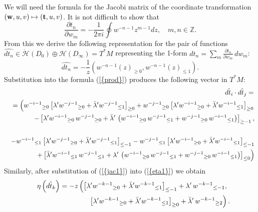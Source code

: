 \documentclass[numbook, envcountsame, envcountreset]{svjour3}
\begin{document}
We will need the formula for the Jacobi matrix of the coordinate transformation $({\bf w}, u, v) \mapsto ({\bf t}, u, v)$. It is not difficult to show that
\begin{equation}\label{jac}
\frac{{\partial} t_n}{{\partial} w_m} =-\frac1{2\pi i}\oint w^{-n-1} z^{m-1} dz, \quad m, n\in \mathbb Z.
\end{equation}
From this we derive the following representation for the pair of functions $\hat{dt_n}\in \dot {\mathcal H}(D_0)\oplus {\mathcal H} (D_\infty) =T^*M$
representing the 1-form $dt_n =\sum_m \frac{{\partial} t_n}{{\partial} w_m}\, dw_m$:
\begin{equation}\label{jac1}
\hat{dt_n} = -\frac1{z} \left( w^{-n-1}(z)_{\geq 0}, w^{-n-1}(z)_{\leq 1}\right).
\end{equation}
Substitution into the formula {(\ref{{prod}})} produces the following vector in $T^*M$:
\begin{eqnarray}
&&
\hat{dt_i}\cdot \hat {dt_j} =
{\nonumber}\\
&&
=\left({w^{-i-1}}_{\geq 0} \left[ \lambda' {w^{-j-1}}_{\geq 0} +\bar\lambda' {w^{-j-1}}_{\leq 1}\right]_{\geq 0}
+ {w^{-j-1}}_{\geq 0} \left[ \lambda' {w^{-i-1}}_{\geq 0} +\bar\lambda' {w^{-i-1}}_{\leq 1}\right]_{\geq 0}
\right.
{\nonumber}\\
&&
-\left[ \lambda' {w^{-i-1}}_{\geq 0}\,{w^{-j-1}}_{\geq 0} +\bar\lambda'\,\left( {w^{-i-1}}_{\geq 0}\, {w^{-j-1}}_{\leq 1} +{w^{-j-1}}_{\geq 0}\, {w^{-i-1}}_{\leq 1}\right)\right]_{\geq -1},
{\nonumber}\\
&&
{\nonumber}\\
&&
-{w^{-i-1}}_{\leq 1} \left[ \lambda' {w^{-j-1}}_{\geq 0} +\bar\lambda' {w^{-j-1}}_{\leq 1}\right]_{\leq -1}
- {w^{-j-1}}_{\leq 1} \left[ \lambda' {w^{-i-1}}_{\geq 0} +\bar\lambda' {w^{-i-1}}_{\leq 1}\right]_{\leq -1}
{\nonumber}\\
&&\left.
+\left[ \bar\lambda' {w^{-i-1}}_{\leq 1}\,{w^{-j-1}}_{\leq 1} +\lambda'\,\left( {w^{-i-1}}_{\geq 0}\, {w^{-j-1}}_{\leq 1} +{w^{-j-1}}_{\geq 0}\, {w^{-i-1}}_{\leq 1}\right)\right]_{\leq 0}
\right)
{\nonumber}
\end{eqnarray}
Similarly, after substitution of {(\ref{{jac1}})} into {(\ref{{eta1}})} we obtain
\begin{eqnarray}
&&
\eta\left( \hat{dt_k}\right)=
-z\left( \left[\lambda' {w^{-k-1}}_{\geq 0} +\bar \lambda' {w^{-k-1}}_{\leq 1} \right]_{\leq -1} +\lambda' \,  {w^{-k-1}}_{\leq -1},
\right.
{\nonumber}\\
&&
\left.
\qquad\qquad\qquad\quad\left[ \lambda' {w^{-k-1}}_{\geq 0} +\bar \lambda' {w^{-k-1}}_{\leq 1} \right]_{\geq 0} +\bar\lambda'\,  {w^{-k-1}}_{\geq 2} 
\right).
{\nonumber}
\end{eqnarray}
\end{document}
